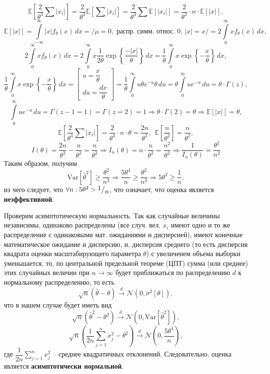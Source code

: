 \documentclass[a4paper, 12pt]{article}
\newcommand{\frc}[2]{\raisebox{2pt}{$#1$}\big/\raisebox{-3pt}{$#2$}}
\begin{document}
    $$\mathbb{E}\left[\dfrac{2}{\theta^3}\sum{|x_i|}\right]=\dfrac{2}{\theta^3}\mathbb{E}\left[\sum{|x_i|}\right]=\dfrac{2}{\theta^3}\sum{\mathbb{E}\left[|x_i|\right]}=\dfrac{2}{\theta^3}\cdot n\cdot\mathbb{E}\left[|x|\right],$$
    $$\mathbb{E}\left[|x|\right]=\int\limits_{-\infty}^{\infty}|x|f_{\theta}(x)\,dx=/\mu=0,\text{ распр. симм. относ. 0},\,|x|=x/=2\int\limits_{0}^{\infty}xf_{\theta}(x)\,dx,$$
    $$2\int\limits_{0}^{\infty}xf_{\theta}(x)\,dx=2\int\limits_{0}^{\infty}x\dfrac{1}{2\theta}\exp{\left\{\dfrac{-|x|}{\theta}\right\}}\,dx=\dfrac{1}{\theta}\int\limits_{0}^{\infty}x\exp{\left\{-\dfrac{x}{\theta}\right\}}\,dx,$$
    $$\dfrac{1}{\theta}\int\limits_{0}^{\infty}x\exp{\left\{-\dfrac{x}{\theta}\right\}}\,dx=\begin{bmatrix}
        u=\dfrac{x}{\theta}\\
        du=\dfrac{dx}{\theta}
    \end{bmatrix}=
    \dfrac{1}{\theta}\int\limits_{0}^{\infty}u\theta e^{-u}\theta\,du=\theta\int\limits_{0}^{\infty}ue^{-u}\,du=\theta\cdot\Gamma(z),$$
    $$\int\limits_{0}^{\infty}ue^{-u}\,du=\Gamma(z-1=1)=\Gamma(z=2)=1\Rightarrow\theta\cdot\Gamma(2)=\theta\Rightarrow\mathbb{E}\left[|x|\right]=\theta,$$
    $$\mathbb{E}\left[\dfrac{2}{\theta^3}\sum{|x_i|}\right]=\dfrac{2}{\theta^3}\cdot n\cdot\theta=\dfrac{2n}{\theta^2},\ \ \mathbb{E}\left[\dfrac{n}{\theta^2}\right]=\dfrac{n}{\theta^2},$$
    $$I\left(\theta\right)=\dfrac{2n}{\theta^2}-\dfrac{n}{\theta^2}=\dfrac{n}{\theta^2}\Rightarrow I_n\left(\theta\right)=n\cdot\dfrac{n}{\theta^2}=\dfrac{n^2}{\theta^2}\Rightarrow\dfrac{1}{I_n(\theta)}=\dfrac{\theta^2}{n^2}$$
    Таким образом, получим
    $$\text{Var}{\left[\hat{\theta}^2\right]}\geq \dfrac{\theta^2}{n^2}\Rightarrow\dfrac{5\theta^4}{n}\geq \dfrac{\theta^2}{n^2}\Rightarrow 5\theta^2\geq \dfrac{1}{n},$$
    из чего следует, что $\forall n:5\theta^2>\frc{1}{n}$, что означает, что оценка является \textbf{неэффективной}.


    Проверим асимптотическую нормальность. Так как случайные величины
    независимы, одинаково распределены (все случ. вел. $x_i$ имеют одно и то же распределение с одинаковыми мат. ожиданиями и дисперсией),
    имеют конечные математическое ожидание и дисперсию,
    и, дисперсия среднего (то есть дисперсия квадрата оценки масштабирующего параметра $\theta$) с увеличенем объема выборки уменьшается,
    то, по центральной предельной теореме (ЦПТ) сумма (или среднее) этих случайных величин при $n\rightarrow\infty$ будет приближаться по распределению $d$ к нормальному распределению,
    то есть $$\sqrt{n}\left(\hat{\theta}-\theta\right)\xrightarrow{d}\mathcal{N}\left(0,\sigma^2\left[\theta\right]\right),$$ что в нашем случае будет иметь вид
    $$\sqrt{n}\left(\hat{\theta}^2-\theta^2\right)\xrightarrow{d}\mathcal{N}\left(0,\text{Var}{\left[\hat{\theta}^2\right]}\right),$$
    $$\sqrt{n}\left(\dfrac{1}{2n}\sum\limits_{j=1}^{n}x_{j}^2-\theta^2\right)\xrightarrow{d}\mathcal{N}\left(0,\dfrac{5\theta^4}{n}\right),$$
    где $\dfrac{1}{2n}\sum\limits_{j=1}^{n}x_{j}^2$ -- среднее квадратичных отклонений. Следовательно, оценка является \textbf{асимптотически нормальной}.
\end{document}
